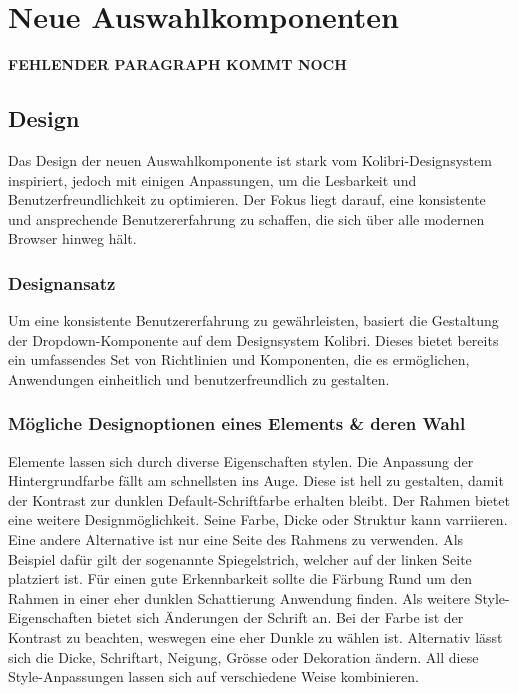 \chapter{Neue Auswahlkomponenten}
\label{chap:newComponent}

{\color{red} \textbf{FEHLENDER PARAGRAPH KOMMT NOCH}}


\section{Design}
\label{sec:design}

Das Design der neuen Auswahlkomponente ist stark vom Kolibri-Designsystem inspiriert, jedoch mit einigen Anpassungen, um die Lesbarkeit und Benutzerfreundlichkeit zu optimieren. 
Der Fokus liegt darauf, eine konsistente und ansprechende Benutzererfahrung zu schaffen, die sich über alle modernen Browser hinweg hält.


\subsection{Designansatz}
\label{sec:designIdea}

Um eine konsistente Benutzererfahrung zu gewährleisten, basiert die Gestaltung der Dropdown-Komponente auf dem Designsystem Kolibri.
Dieses bietet bereits ein umfassendes Set von Richtlinien und Komponenten, die es ermöglichen, Anwendungen einheitlich und benutzerfreundlich zu gestalten.


\subsection{Mögliche Designoptionen eines Elements \& deren Wahl}
\label{sec:possibleDesignOptions}

Elemente lassen sich durch diverse Eigenschaften stylen.
Die Anpassung der Hintergrundfarbe fällt am schnellsten ins Auge.
Diese ist hell zu gestalten, damit der Kontrast zur dunklen Default-Schriftfarbe erhalten bleibt.
Der Rahmen bietet eine weitere Designmöglichkeit. 
Seine Farbe, Dicke oder Struktur kann varriieren. 
Eine andere Alternative ist nur eine Seite des Rahmens zu verwenden. 
Als Beispiel dafür gilt der sogenannte Spiegelstrich, welcher auf der linken Seite platziert ist.
Für einen gute Erkennbarkeit sollte die Färbung Rund um den Rahmen in einer eher dunklen Schattierung Anwendung finden.
Als weitere Style-Eigenschaften bietet sich Änderungen der Schrift an.
Bei der Farbe ist der Kontrast zu beachten, weswegen eine eher Dunkle zu wählen ist.
Alternativ lässt sich die Dicke, Schriftart, Neigung, Grösse oder Dekoration ändern.
All diese Style-Anpassungen lassen sich auf verschiedene Weise kombinieren.

